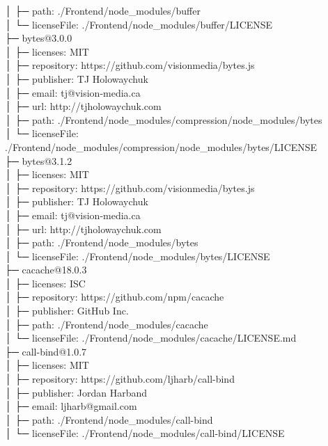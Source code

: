 \documentclass[
    paper=a4,
    twoside=false,
    parskip=half,
    listof=entryprefix,
    listof=totoc,
    index=totoc,
    bibliography=totoc,
    headsepline,
]{scrbook}
\begin{document}
    │  ├─ path: ./Frontend/node\_modules/buffer\\
    │  └─ licenseFile: ./Frontend/node\_modules/buffer/LICENSE\\
    ├─ bytes@3.0.0\\
    │  ├─ licenses: MIT\\
    │  ├─ repository: https://github.com/visionmedia/bytes.js\\
    │  ├─ publisher: TJ Holowaychuk\\
    │  ├─ email: tj@vision-media.ca\\
    │  ├─ url: http://tjholowaychuk.com\\
    │  ├─ path: ./Frontend/node\_modules/compression/node\_modules/bytes\\
    │  └─ licenseFile: ./Frontend/node\_modules/compression/node\_modules/bytes/LICENSE\\
    ├─ bytes@3.1.2\\
    │  ├─ licenses: MIT\\
    │  ├─ repository: https://github.com/visionmedia/bytes.js\\
    │  ├─ publisher: TJ Holowaychuk\\
    │  ├─ email: tj@vision-media.ca\\
    │  ├─ url: http://tjholowaychuk.com\\
    │  ├─ path: ./Frontend/node\_modules/bytes\\
    │  └─ licenseFile: ./Frontend/node\_modules/bytes/LICENSE\\
    ├─ cacache@18.0.3\\
    │  ├─ licenses: ISC\\
    │  ├─ repository: https://github.com/npm/cacache\\
    │  ├─ publisher: GitHub Inc.\\
    │  ├─ path: ./Frontend/node\_modules/cacache\\
    │  └─ licenseFile: ./Frontend/node\_modules/cacache/LICENSE.md\\
    ├─ call-bind@1.0.7\\
    │  ├─ licenses: MIT\\
    │  ├─ repository: https://github.com/ljharb/call-bind\\
    │  ├─ publisher: Jordan Harband\\
    │  ├─ email: ljharb@gmail.com\\
    │  ├─ path: ./Frontend/node\_modules/call-bind\\
    │  └─ licenseFile: ./Frontend/node\_modules/call-bind/LICENSE\\
\end{document}
